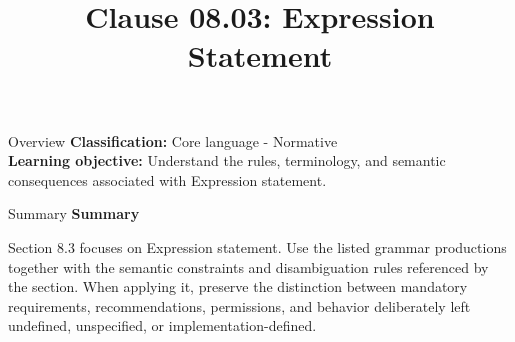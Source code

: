 \documentclass[10pt,letterpaper]{article}
\title{Clause 08.03: Expression Statement}
\author{}
\date{}
\begin{document}
\maketitle
\begin{CornellOverviewBox}{Overview}
\textbf{Classification:} Core language - Normative\\[2pt]
\textbf{Learning objective:} Understand the rules, terminology, and semantic consequences associated with Expression statement.
\end{CornellOverviewBox}\begin{CornellSummaryBox}{Summary}
{\sffamily\bfseries\color{Accent} Summary}\par\vspace{3pt}Section 8.3 focuses on Expression statement. Use the listed grammar productions together with the semantic constraints and disambiguation rules referenced by the section. When applying it, preserve the distinction between mandatory requirements, recommendations, permissions, and behavior deliberately left undefined, unspecified, or implementation-defined.
\end{CornellSummaryBox}
\end{document}
